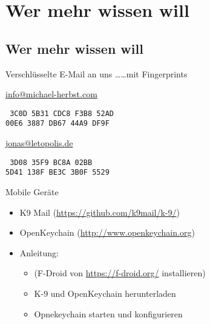 \section{Wer mehr wissen will}
\subsection*{Wer mehr wissen will}

\blackframe


\begin{frame}{Verschlüsselte E-Mail an uns \dots}{\dots mit Fingerprints}
	\begin{block}{\url{info@michael-herbst.com}}
		\begin{center}
			\tt
			\larger
			3C0D 5B31 CDC8 F3B8 52AD\\
			00E6 3887 DB67 44A9 DF9F
		\end{center}
	\end{block}
	\begin{block}{\url{jonas@letopolis.de}}
		\begin{center}
			\tt
			 3D08 35F9 BC8A 02BB \\
			5D41 138F BE3C 3B0F 5529
		\end{center}
	\end{block}
\end{frame}

\blackframe

\begin{frame}{Mobile Geräte}
	\begin{itemize}
		\item K9 Mail (\url{https://github.com/k9mail/k-9/})
		\item OpenKeychain (\url{http://www.openkeychain.org})
		\item Anleitung: 
			\begin{itemize}
				\item (F-Droid von \url{https://f-droid.org/} installieren)
				\item K-9 und OpenKeychain herunterladen
				\item Opnekeychain starten und konfigurieren
			\end{itemize}
	\end{itemize}
\end{frame}

